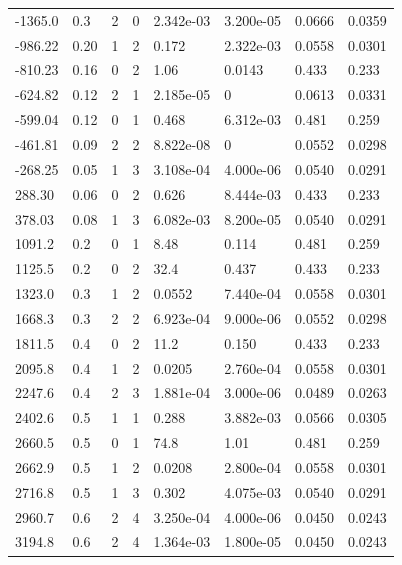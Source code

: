 \documentclass[preview]{standalone}
\begin{document}
{{\begin{tabular}{L{1.2cm}C{1.2cm} C{0.3cm}C{0.5cm} C{1.4cm}C{1.4cm} C{1.4cm}C{1.4cm}}
  -1365.0  &   0.3  & 2     &  0 &  2.342e-03  & 3.200e-05  & 0.0666 &  0.0359   \\ 
  -986.22  &  0.20  & 1     &  2 &  0.172  & 2.322e-03  & 0.0558 &  0.0301   \\ 
  -810.23  &  0.16  & 0     &  2 &  1.06  & 0.0143  & 0.433 &  0.233   \\ 
  -624.82  &  0.12  & 2     &  1 &  2.185e-05  & 0  & 0.0613 &  0.0331   \\ 
  -599.04  &  0.12  & 0     &  1 &  0.468  & 6.312e-03  & 0.481 &  0.259   \\ 
  -461.81  &  0.09  & 2     &  2 &  8.822e-08  & 0  & 0.0552 &  0.0298   \\ 
  -268.25  &  0.05  & 1     &  3 &  3.108e-04  & 4.000e-06  & 0.0540 &  0.0291   \\ 
  288.30  &  0.06  & 0     &  2 &  0.626  & 8.444e-03  & 0.433 &  0.233   \\ 
  378.03  &  0.08  & 1     &  3 &  6.082e-03  & 8.200e-05  & 0.0540 &  0.0291   \\ 
  1091.2  &   0.2  & 0     &  1 &  8.48  & 0.114  & 0.481 &  0.259   \\ 
  1125.5  &   0.2  & 0     &  2 &  32.4  & 0.437  & 0.433 &  0.233   \\ 
  1323.0  &   0.3  & 1     &  2 &  0.0552  & 7.440e-04  & 0.0558 &  0.0301   \\ 
  1668.3  &   0.3  & 2     &  2 &  6.923e-04  & 9.000e-06  & 0.0552 &  0.0298   \\ 
  1811.5  &   0.4  & 0     &  2 &  11.2  & 0.150  & 0.433 &  0.233   \\ 
  2095.8  &   0.4  & 1     &  2 &  0.0205  & 2.760e-04  & 0.0558 &  0.0301   \\ 
  2247.6  &   0.4  & 2     &  3 &  1.881e-04  & 3.000e-06  & 0.0489 &  0.0263   \\ 
  2402.6  &   0.5  & 1     &  1 &  0.288  & 3.882e-03  & 0.0566 &  0.0305   \\ 
  2660.5  &   0.5  & 0     &  1 &  74.8  & 1.01  & 0.481 &  0.259   \\ 
  2662.9  &   0.5  & 1     &  2 &  0.0208  & 2.800e-04  & 0.0558 &  0.0301   \\ 
  2716.8  &   0.5  & 1     &  3 &  0.302  & 4.075e-03  & 0.0540 &  0.0291   \\ 
  2960.7  &   0.6  & 2     &  4 &  3.250e-04  & 4.000e-06  & 0.0450 &  0.0243   \\ 
  3194.8  &   0.6  & 2     &  4 &  1.364e-03  & 1.800e-05  & 0.0450 &  0.0243   \\ 

\end{tabular}}}
\end{document}
